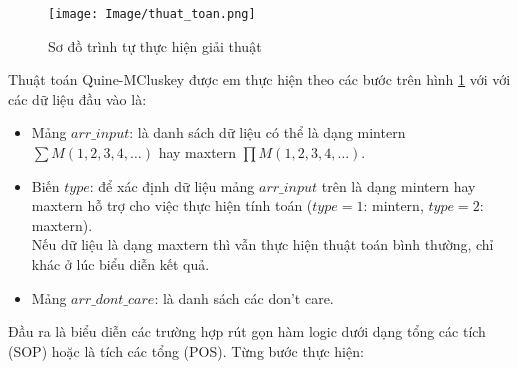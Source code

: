 \documentclass[titlepage]{article} %
\begin{document}
\begin{figure}[H] 
	\centering
	\texttt{[image: Image/thuat\_toan.png]}
	\caption[Sơ đồ trình tự thực hiện giải thuật]{\centering Sơ đồ trình tự thực hiện giải thuật} \label{img:thuat_toan}
\end{figure} \vspace{-0.5cm}
\hspace{0.4cm}Thuật toán Quine-MCluskey \cite{QM:2020} được em thực hiện theo các bước trên hình \ref{img:thuat_toan} với với các dữ liệu đầu vào là: 
\begin{itemize}\vspace{-0.5cm}
 \item Mảng $arr\_input$: là danh sách dữ liệu có thể là dạng mintern $\sum M(1,2,3,4, \dots)$ hay maxtern $\prod M(1,2,3,4, \dots)$.
 \item Biến $type$: để xác định dữ liệu mảng $arr\_input$ trên là dạng mintern hay maxtern hỗ trợ cho việc thực hiện tính toán ($type = 1$: mintern, $type = 2$: maxtern).\\
 Nếu dữ liệu là dạng maxtern thì vẫn thực hiện thuật toán bình thường, chỉ khác ở lúc biểu diễn kết quả.
 \item Mảng $arr\_dont\_care$: là danh sách các don't care.
\end{itemize}
\vspace{0.0cm}
\vspace{-0.5cm}\hspace{0.4cm} Đầu ra là biểu diễn các trường hợp rút gọn hàm logic dưới dạng tổng các tích (SOP) hoặc là tích các tổng (POS).
\newline 
\newline
Từng bước thực hiện:
\end{document}
